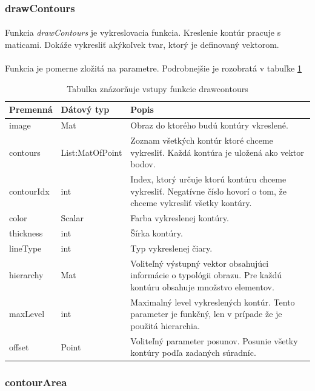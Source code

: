 \documentclass[12pt]{article}
\begin{document}
\subsubsection{drawContours}
\paragraph{}
Funkcia \emph{drawContours} je vykreslovacia funkcia. Kreslenie kontúr pracuje s maticami. Dokáže vykresliť akýkoľvek tvar, ktorý je definovaný vektorom.
\cite{drawcontours_doc}
\cite{OpenCVDoc}
\paragraph{}
Funkcia je pomerne zložitá na parametre. Podrobnejšie je rozobratá v tabuľke \ref{drawcontoursPar}
\begin{table}
	\centering
    \begin{tabular}{ | l | l | p{5cm} |}
    \hline
    Premenná & Dátový typ & Popis \\ \hline
    image & Mat & Obraz do ktorého budú kontúry vkreslené. \\ \hline
    contours & List:MatOfPoint & Zoznam všetkých kontúr ktoré chceme vykresliť. Každá kontúra je uložená ako vektor bodov. \\ \hline
    contourIdx & int & Index, ktorý určuje ktorú kontúru chceme vykresliť. Negatívne číslo hovorí o tom, že chceme vykresliť všetky kontúry. \\ \hline
    color & Scalar & Farba vykreslenej kontúry. \\ \hline
    thickness & int & Šírka kontúry. \\ \hline
    lineType & int & Typ vykreslenej čiary. \\ \hline
    hierarchy & Mat & Voliteľný výstupný vektor obsahujúci informácie o typológii obrazu. Pre každú kontúru obsahuje množstvo elementov. \\ \hline
    maxLevel & int & Maximalný level vykreslených kontúr. Tento parameter je funkčný, len v prípade že je použitá hierarchia. \\ \hline
    offset & Point & Voliteľný parameter posunov. Posunie všetky kontúry podľa zadaných súradníc. \\
    \hline
    \end{tabular}
  	\caption{Tabulka znázorňuje vstupy funkcie drawcontours}
  	\label{drawcontoursPar}
\end{table}
\subsubsection{contourArea}
\end{document}
